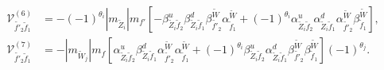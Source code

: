 \documentclass[final,3p,times]{elsarticle}
\begin{document}
\begin{align}
\mathcal{V}_{\tilde{f'}_2 \tilde{f}_1}^{(6)} &= -(-1)^{\theta_i} |m_{\tilde{Z}_i}| m_{f'} \left[-\beta_{\tilde{Z}_i \tilde{f}_2}^{u} \beta_{\tilde{Z}_i \tilde{f}_1}^{d} \beta_{\tilde{f'}_2}^{\tilde{W}} \alpha_{\tilde{f}_1}^{\tilde{W}} + (-1)^{\theta_i} \alpha_{\tilde{Z}_i \tilde{f}_2}^{u} \alpha_{\tilde{Z}_i \tilde{f}_1}^{d} \alpha_{\tilde{f'}_2}^{\tilde{W}} \beta_{\tilde{f}_1}^{\tilde{W}}\right], \\
\mathcal{V}_{\tilde{f'}_2 \tilde{f}_1}^{(7)} &= -|m_{\tilde{W}_j}|m_{f}\left[ \alpha_{\tilde{Z}_i \tilde{f}_2}^{u} \beta_{\tilde{Z}_i \tilde{f}_1}^{d} \alpha_{\tilde{f'}_2}^{\tilde{W}} \alpha_{\tilde{f}_1}^{\tilde{W}} + (-1)^{\theta_i} \beta_{\tilde{Z}_i \tilde{f}_2}^{u} \alpha_{\tilde{Z}_i \tilde{f}_1}^{d} \beta_{\tilde{f'}_2}^{\tilde{W}} \beta_{\tilde{f}_1}^{\tilde{W}}\right](-1)^{\theta_j}. \\
\end{align}
\end{document}
